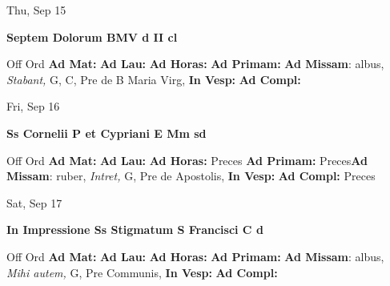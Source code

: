 \documentclass[10pt]{book}
\begin{document}
\begin{center}
\begin{minipage}{3.5in}
\vspace{2em}
\begin{center}Thu, Sep 15
\end{center}
\textbf{ \large Septem Dolorum BMV
\textnormal{\normalsize d II cl}}

\begin{justify}Off Ord
\textbf{Ad Mat: }
\textbf{Ad Lau: }
\textbf{Ad Horas: }
\textbf{Ad Primam: }\textbf{Ad Missam}: albus, \textit{Stabant,} G, C, Pre de B Maria Virg, 
\textbf{In Vesp: }
\textbf{Ad Compl: }
\end{justify}
\end{minipage}
\end{center}

\begin{center}
\begin{minipage}{3.5in}
\vspace{2em}
\begin{center}Fri, Sep 16
\end{center}
\textbf{ \large Ss Cornelii P et Cypriani E Mm
\textnormal{\normalsize sd}}

\begin{justify}Off Ord
\textbf{Ad Mat: }
\textbf{Ad Lau: }
\textbf{Ad Horas: }Preces
\textbf{Ad Primam: }Preces\textbf{Ad Missam}: ruber, \textit{Intret,} G, Pre de Apostolis, 
\textbf{In Vesp: }
\textbf{Ad Compl: }Preces
\end{justify}
\end{minipage}
\end{center}

\begin{center}
\begin{minipage}{3.5in}
\vspace{2em}
\begin{center}Sat, Sep 17
\end{center}
\textbf{ \large In Impressione Ss Stigmatum S Francisci C
\textnormal{\normalsize d}}

\begin{justify}Off Ord
\textbf{Ad Mat: }
\textbf{Ad Lau: }
\textbf{Ad Horas: }
\textbf{Ad Primam: }\textbf{Ad Missam}: albus, \textit{Mihi autem,} G, Pre Communis, 
\textbf{In Vesp: }
\textbf{Ad Compl: }
\end{justify}
\end{minipage}
\end{center}
\end{document}
